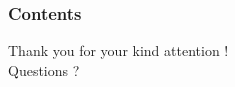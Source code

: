 \documentclass{beamer}
\begin{document}

\begin{frame}
  \small
  \frametitle{Contents}
  \tableofcontents
\end{frame}









% 



\appendix   %
\printbibliography



\begin{frame}
  \Large
  \centering
  Thank you for your kind attention \Large \Smiley{} ! \\
  \centering
  Questions ?
\end{frame}

\end{document}
